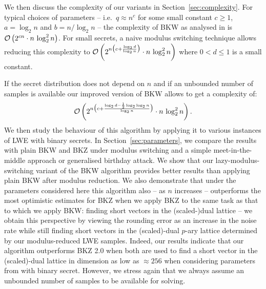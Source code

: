 \def\polyfactor{n\, \log_2^2 n}
We then discuss the complexity of our variants in Section~\ref{sec:complexity}. For typical choices of parameters --  i.e.\ $q \approx n^c$ for some small constant $c\geq 1$, $a = \log_2 n$ and $b = n/\log_2 n$ --  the complexity of BKW  as analysed in \cite{albrecht-cid-faugere-fitzpatrick-perret:dcc2013} 
is $\bigO{2^{cn}\cdot \polyfactor}$. For small secrets, a naive modulus switching technique allows reducing this complexity to  
$\bigO{2^{n\big(c+\frac{\log_2 d}{\log_2 n}\big)} \cdot \polyfactor}$ where $0<d\leq 1$ is a small constant. 
\begin{comment}
sage: n,c,d = var('n,c,d')
sage: assume(c>0)
sage: assume(c, 'integer')
sage: assume(n>0)
sage: assume(d<=1)
sage: assume(d>0)
sage: q = n^c
sage: b = n/log(n)
sage: a = log(n)
sage: sigma = sqrt(n)
sage: p = d*q/sqrt(a)
sage: f = e^(n*log(d)/log(n)) # d^(n/log(n)), base e
sage: g = e^(c*n) # n^(c*n/log(n)) 
sage: h = (1/sqrt(log(n)))^(n/log(n))
sage: assert( bool(f*g*h == p^b) == True ) 
sage: simple = e^(n*(c+ (log(d)-1/2*log(log(n)))/log(n)))
sage: assert( bool(simple == p^b) == True ) 
\end{comment}
If the secret distribution does not depend on $n$ and if an unbounded number of \LWE samples is available our improved version of BKW allows to get a complexity of:
\def\complexity{\bigO{2^{n\big(c+\frac{\log_2 d-\frac 1 2 \log_2 \log_2 n}{\log_2 n}\big)}\cdot \polyfactor}}
$$ 
\complexity.
$$
We then study the behaviour of this algorithm by applying it to various instances of LWE with binary secrets.  In Section~\ref{sec:parameters},
we compare the results with plain BKW and BKZ under modulus switching and a simple meet-in-the-middle approach or generalised birthday attack. We show that our lazy-modulus-switching variant of the BKW algorithm provides better results than applying plain BKW after modulus reduction. We also demonstrate that under the parameters considered here this algorithm also -- as $n$ increases -- outperforms the most optimistic estimates for BKZ when we apply BKZ to the same task as that to which we apply BKW: finding short vectors in the (scaled-)dual lattice -- we obtain this perspective by viewing the rounding error as an increase in the noise rate while still finding short vectors in the \mbox{(scaled)-}dual $p$-ary lattice determined by our modulus-reduced LWE samples. Indeed, our results indicate that our algorithm outperforms BKZ 2.0 when both are used to find a short vector in the \mbox{(scaled)-}dual lattice in dimension as low as $\approx 256$ when considering \LWE{} parameters from \cite{regev:acm09} with binary secret. However, we stress again that we always assume an unbounded number of samples to be available for solving.

